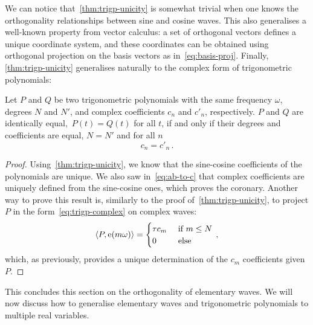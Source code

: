 We can notice that~\cref{thm:trigp-unicity} is somewhat trivial when one knows the
orthogonality relationships between sine and cosine waves. This also generalises a
well-known property from vector calculus: a set of orthogonal vectors defines a unique
coordinate system, and these coordinates can be obtained using orthogonal projection on
the basis vectors as in~\cref{eq:basis-proj}. Finally, \cref{thm:trigp-unicity}
generalises naturally to the complex form of trigonometric polynomials:
\begin{corollary}
  \label{corr:trigp-unicity-cplx}
  Let $P$ and $Q$ be two trigonometric polynomials with the same frequency $\omega$,
  degrees $N$ and $N'$, and complex coefficients $c_n$ and $c'_n$, respectively. $P$ and
  $Q$ are identically equal,~\ie $P(t)=Q(t)$ for all $t$, if and only if their degrees and
  coefficients are equal, \ie $N=N'$ and for all $n$
  \begin{equation}
    c_n=c'_n\,.
  \end{equation}
\end{corollary}
\begin{proof}
  Using~\cref{thm:trigp-unicity}, we know that the sine-cosine coefficients of the
  polynomials are unique. We also saw in~\cref{eq:ab-to-c} that complex coefficients are
  uniquely defined from the sine-cosine ones, which proves the coronary. Another way to
  prove this result is, similarly to the proof of~\cref{thm:trigp-unicity}, to project $P$
  in the form~\cref{eq:trigp-complex} on complex waves:
  \begin{equation}
    \braket{P,\operatorname{e}(m\omega)}=
    \begin{cases}
      \tau c_m&~\text{if}~m\leq N\\
      0&~\text{else}
    \end{cases}\,,
  \end{equation}
  which, as previously, provides a unique determination of the $c_m$ coefficients given
  $P$.
\end{proof}
This concludes this section on the orthogonality of elementary waves. We will now discuss
how to generalise elementary waves and trigonometric polynomials to multiple real
variables.
